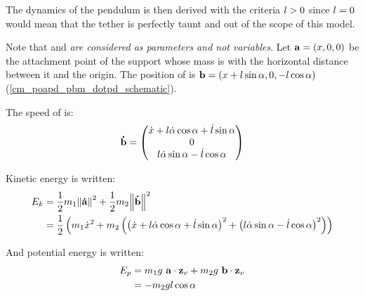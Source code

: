 The dynamics of the pendulum is then derived with the criteria $l>0$ since $l=0$
would mean that the tether is perfectly taunt and out of the scope of this model.

Note that  and  \emph{are considered as parameters and not variables}. Let
$\vect{A} = \left(\scal{x}, 0, 0\right)$ be the attachment point of the support whose mass is
 with  the horizontal distance between it and the origin. The position of
 is $\vect{B} = \left(\scal{x} + \scal{l} \sin{\scal{\alpha}}, 0, -\scal{l}
	\cos{\scal{\alpha}}\right)$ (\cref{cm_poapd_pbm_dotpd_schematic}).

The speed of  is:
\begin{align}
	\vect{\dot{B}} =
	\begin{pmatrix}
		\scal{\dot{x}} + \scal{l} \dot{\scal{\alpha}}\cos{\scal{\alpha}} + \scal{\dot{l}}\sin{\scal{\alpha}} \\
		0                                                                                                    \\
		\scal{l} \scal{\dot{\alpha}}\sin{\scal{\alpha}} - \scal{\dot{l}}\cos{\scal{\alpha}}
	\end{pmatrix}
\end{align}

\trigsh{}

Kinetic energy is written:
\begin{align}
	\ldscal{E}{k} & = \frac{1}{2} \ldscal{m}{1} \norm{\vect{\dot{A}}}^2 + \frac{1}{2} \ldscal{m}{2} \norm{\vect{\dot{B}}}^2 \nonumber                                                                                                                                                                                                  \\
	              & =\frac{1}{2}  \left(\ldscal{m}{1} \scal{\dot{x}}^2 + \ldscal{m}{2} \left(\left(\scal{\dot{x}} + \scal{l} \dot{\scal{\alpha}}\cos{\scal{\alpha}} + \scal{\dot{l}}\sin{\scal{\alpha}} \right)^2 + \left(\scal{l} \dot{\scal{\alpha}}\sin{\scal{\alpha}} - \scal{\dot{l}} \cos{\scal{\alpha}}\right)^2\right) \right)
\end{align}

And potential energy is written:
\begin{align}
	\ldscal{E}{p} & = \ldscal{m}{1} \scal{g}~\vect{A}\cdot\ldvect{z}{v} + \ldscal{m}{2} \scal{g}~\vect{B}\cdot\ldvect{z}{v} \nonumber \\
	              & = - \ldscal{m}{2}\scal{g}\scal{l}\cos{\alpha}
\end{align}

